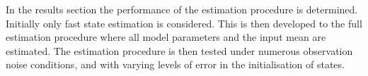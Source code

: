 
In the results section the performance of the estimation procedure is determined. Initially only fast state estimation is considered. This is then developed to the full estimation procedure where all model parameters and the input mean are estimated. The estimation procedure is then tested under numerous observation noise conditions, and with varying levels of error in the initialisation of states.





